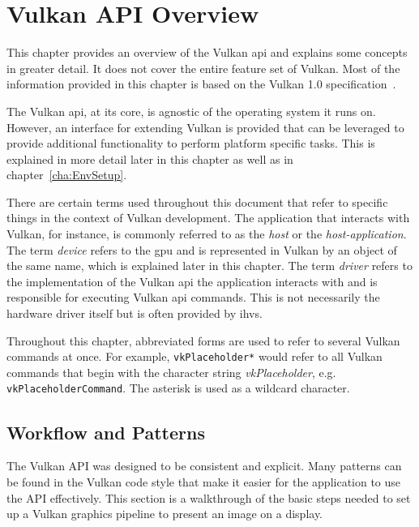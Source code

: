 
\chapter{Vulkan API Overview}
\label{cha:VulkanOverview}
  This chapter provides an overview of the Vulkan \gls{api} and explains some concepts in greater detail.
  It does not cover the entire feature set of Vulkan.
  Most of the information provided in this chapter is based on the Vulkan 1.0 specification~\cite{vkspec}.

  The Vulkan \gls{api}, at its core, is agnostic of the operating system it runs on.
  However, an interface for extending Vulkan is provided that can be leveraged to provide additional functionality to perform platform specific tasks. This is explained in more detail later in this chapter as well as in chapter~\ref{cha:EnvSetup}.

  There are certain terms used throughout this document that refer to specific things in the context of Vulkan development.
  The application that interacts with Vulkan, for instance, is commonly referred to as the \textit{host} or the \textit{host-application}.
  The term \textit{device} refers to the \gls{gpu} and is represented in Vulkan by an object of the same name, which is explained later in this chapter.
  The term \textit{\gls{driver}} refers to the implementation of the Vulkan \gls{api} the application interacts with and is responsible for executing Vulkan \gls{api} commands.
  This is not necessarily the hardware driver itself but is often provided by \glspl{ihv}.

  Throughout this chapter, abbreviated forms are used to refer to several Vulkan commands at once.
  For example, \lstinline{vkPlaceholder*} would refer to all Vulkan commands that begin with the character string \textit{vkPlaceholder}, e.g. \lstinline{vkPlaceholderCommand}. The asterisk is used as a wildcard character.

  \section{Workflow and Patterns}
  \label{sec:WorkflowAndPatterns}
    The Vulkan API was designed to be consistent and explicit.
    Many patterns can be found in the Vulkan code style that make it easier for the application to use the API effectively.
    This section is a walkthrough of the basic steps needed to set up a Vulkan graphics pipeline to present an image on a display.

